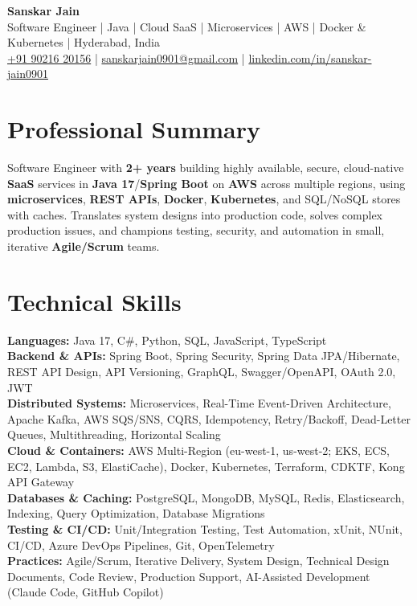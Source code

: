 \documentclass[a4paper,10pt]{article}
\begin{document}
\begin{center}
    {\LARGE \textbf{Sanskar Jain}} \\
    \vspace{2pt}
    Software Engineer \;|\; Java \;|\; Cloud SaaS \;|\; Microservices \;|\; AWS \;|\; Docker \& Kubernetes \;|\; Hyderabad, India \\
    \vspace{2pt}
    \href{tel:+919021620156}{+91 90216 20156} \;|\;
    \href{mailto:sanskarjain0901@gmail.com}{sanskarjain0901@gmail.com} \;|\;
    \href{https://www.linkedin.com/in/sanskar-jain0901/}{linkedin.com/in/sanskar-jain0901}
\end{center}

\section*{Professional Summary}
Software Engineer with \textbf{2+ years} building highly available, secure, cloud-native \textbf{SaaS} services in \textbf{Java 17}/\textbf{Spring Boot} on \textbf{AWS} across multiple regions, using \textbf{microservices}, \textbf{REST APIs}, \textbf{Docker}, \textbf{Kubernetes}, and SQL/NoSQL stores with caches.
Translates system designs into production code, solves complex production issues, and champions testing, security, and automation in small, iterative \textbf{Agile/Scrum} teams.

\section*{Technical Skills}
\begin{sloppypar}
\noindent
\textbf{Languages:} Java 17, C\#, Python, SQL, JavaScript, TypeScript \\
\textbf{Backend \& APIs:} Spring Boot, Spring Security, Spring Data JPA/Hibernate, REST API Design, API Versioning, GraphQL, Swagger/OpenAPI, OAuth 2.0, JWT \\
\textbf{Distributed Systems:} Microservices, Real-Time Event-Driven Architecture, Apache Kafka, AWS SQS/SNS, CQRS, Idempotency, Retry/Backoff, Dead-Letter Queues, Multithreading, Horizontal Scaling \\
\textbf{Cloud \& Containers:} AWS Multi-Region (eu-west-1, us-west-2; EKS, ECS, EC2, Lambda, S3, ElastiCache), Docker, Kubernetes, Terraform, CDKTF, Kong API Gateway \\
\textbf{Databases \& Caching:} PostgreSQL, MongoDB, MySQL, Redis, Elasticsearch, Indexing, Query Optimization, Database Migrations \\
\textbf{Testing \& CI/CD:} Unit/Integration Testing, Test Automation, xUnit, NUnit, CI/CD, Azure DevOps Pipelines, Git, OpenTelemetry \\
\textbf{Practices:} Agile/Scrum, Iterative Delivery, System Design, Technical Design Documents, Code Review, Production Support, AI-Assisted Development (Claude Code, GitHub Copilot)
\end{sloppypar}
\end{document}
